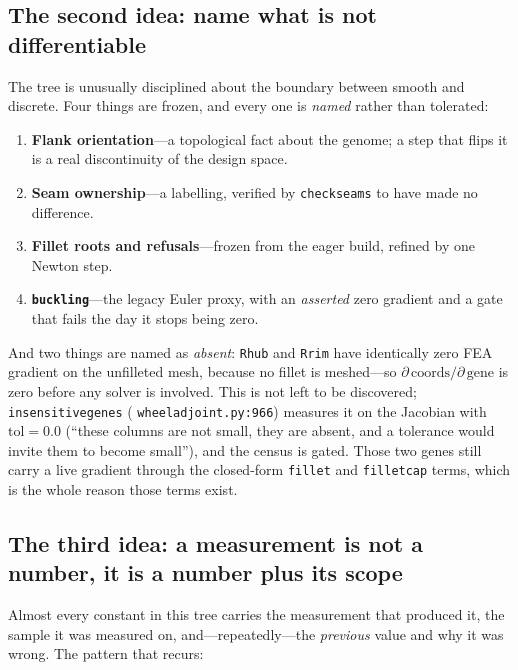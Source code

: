 \documentclass[11pt,a4paper]{article}
\DeclareRobustCommand{\code}[1]{%
  \texttt{\small\def\_{\textunderscore\discretionary{}{}{}}#1}}
\newcommand{\at}[2]{\code{#1:#2}}
\begin{document}
\subsection{The second idea: name what is not differentiable}

The tree is unusually disciplined about the boundary between smooth and discrete. Four
things are frozen, and every one is \emph{named} rather than tolerated:

\begin{enumerate}
\item \textbf{Flank orientation}---a topological fact about the genome; a step that
  flips it is a real discontinuity of the design space.
\item \textbf{Seam ownership}---a labelling, verified by \code{check\_seams} to have
  made no difference.
\item \textbf{Fillet roots and refusals}---frozen from the eager build, refined by one
  Newton step.
\item \textbf{\code{buckling}}---the legacy Euler proxy, with an \emph{asserted} zero
  gradient and a gate that fails the day it stops being zero.
\end{enumerate}

And two things are named as \emph{absent}: \code{R\_hub} and \code{R\_rim} have
identically zero FEA gradient on the unfilleted mesh, because no fillet is meshed---so
$\partial\,\mathrm{coords}/\partial\,\mathrm{gene}$ is zero before any solver is
involved. This is not left to be discovered; \code{insensitive\_genes}
(\at{wheel\_adjoint.py}{966}) measures it on the Jacobian with $\mathrm{tol} = 0.0$
(``these columns are not small, they are absent, and a tolerance would invite them to
become small''), and the census is gated. Those two genes still carry a live gradient
through the closed-form \code{fillet} and \code{fillet\_cap} terms, which is the whole
reason those terms exist.

\subsection{The third idea: a measurement is not a number, it is a number plus its scope}

Almost every constant in this tree carries the measurement that produced it, the sample
it was measured on, and---repeatedly---the \emph{previous} value and why it was wrong.
The pattern that recurs:
\end{document}
